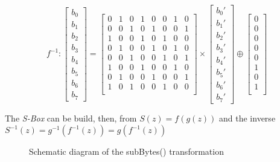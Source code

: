 \documentclass[10pt,a4paper,twoside]{llncs}
\begin{document}
\begin{equation}\label{eq:invSubBytes:matrix}
 f^{-1}:
 \left[
  \begin{array}{c}
    b_{0}\\b_{1}\\b_{2}\\b_{3}\\b_{4}\\b_{5}\\b_{6}\\b_{7}
  \end{array}
 \right]=\left[
  \begin{array}{cccccccc}
    0&1&0&1&0&0&1&0\\
    0&0&1&0&1&0&0&1\\
    1&0&0&1&0&1&0&0\\
    0&1&0&0&1&0&1&0\\
    0&0&1&0&0&1&0&1\\
    1&0&0&1&0&0&1&0\\
    0&1&0&0&1&0&0&1\\
    1&0&1&0&0&1&0&0\\
  \end{array}
 \right]\times\left[
  \begin{array}{c}
    b_{0}'\\b_{1}'\\b_{2}'\\b_{3}'\\b_{4}'\\b_{5}'\\b_{6}'\\b_{7}'
  \end{array}
 \right]\oplus\left[
  \begin{array}{c}
    0\\0\\0\\0\\0\\1\\0\\1\\
  \end{array}
 \right]
\end{equation}

The \emph{S-Box} can be build, then, from $S(z)=f(g(z))$ and the inverse $S^{-1}(z)=g^{-1}(f^{-1}(z))=g(f^{-1}(z))$

\begin{figure}[h]
\begin{center}

\caption{Schematic diagram of the subBytes() transformation}
\label{fig:subBytes}
\end{center}
\end{figure}
\end{document}
